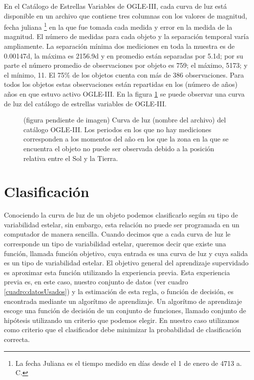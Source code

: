 \documentclass[letterpaper,12pt]{book}
\begin{document}
En el Catálogo de Estrellas Variables de OGLE-III, cada curva de luz está disponible en un archivo que contiene tres columnas con los valores de magnitud, fecha juliana \footnote{La fecha Juliana es el tiempo medido en días desde el 1 de enero de 4713 a. C.} en la que fue tomada cada medida y error en la medida de la magnitud. El número de medidas para cada objeto y la separación temporal varía ampliamente. La separación mínima dos mediciones en toda la muestra es de 0.00147d, la máxima es 2156.9d y en promedio están separadas por 5.1d; por su parte el número promedio de observaciones por objeto es 759; el máximo, 5173; y el mínimo,  11. El 75\% de los objetos cuenta con más de 386 observaciones. Para todos los objetos estas observaciones están repartidas en los (número de años) años en que estuvo activo OGLE-III. En la figura \ref{fig:curvaDeLuz} se puede observar una curva de luz del catálogo de estrellas variables de OGLE-III.    

\begin{figure}
  \label{fig:curvaDeLuz}
  \caption{(figura pendiente de imagen) Curva de luz (nombre del archivo) del catálogo OGLE-III. Los periodos en los que no hay mediciones corresponden a los momentos del año en los que la zona en la que se encuentra el objeto no puede ser observada debido a la posición relativa entre el Sol y la Tierra.}
\end{figure}

\chapter{Clasificación}\label{cap:clasificacion} 

Conociendo la curva de luz de un objeto podemos clasificarlo según su tipo de variabilidad estelar, sin embargo, esta relación no puede ser programada en un computador de manera sencilla. Cuando decimos que a cada curva de luz le corresponde un tipo de variabilidad estelar, queremos decir que existe una función, llamada función objetivo, cuya entrada es una curva de luz y cuya salida es un tipo de variabilidad estelar. El objetivo general del aprendizaje supervidado es aproximar esta función utilizando la experiencia previa. Esta experiencia previa es, en este caso, nuestro conjunto de datos (ver cuadro \ref{cuadro:datosUsados}) y la estimación de esta regla, o función de decisión, es encontrada mediante un algorítmo de aprendizaje. Un algorítmo de aprendizaje escoge una función de decisión de un conjunto de funciones, llamado conjunto de hipótesis utilizando un criterio que podemos elegir. En nuestro caso utilizamos como criterio que el clasificador debe minimizar la probabilidad de clasificación correcta.
\end{document}
